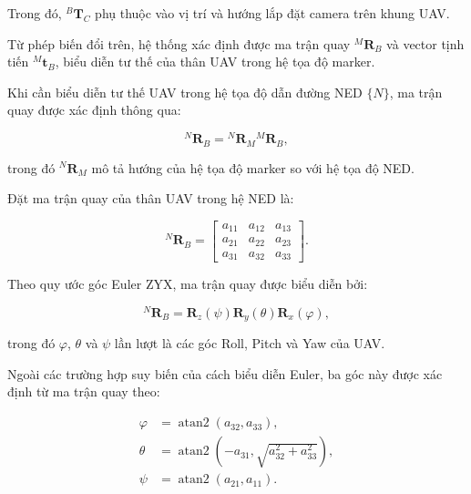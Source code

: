 Trong đó, ${}^{B}\mathbf{T}_{C}$ phụ thuộc
vào vị trí và hướng lắp đặt camera trên
khung UAV.

Từ phép biến đổi trên, hệ thống xác định
được ma trận quay ${}^{M}\mathbf{R}_{B}$
và vector tịnh tiến ${}^{M}\mathbf{t}_{B}$,
biểu diễn tư thế của thân UAV trong hệ
tọa độ marker.

Khi cần biểu diễn tư thế UAV trong hệ
tọa độ dẫn đường NED $\{N\}$, ma trận quay
được xác định thông qua:

\begin{equation}
{}^{N}\mathbf{R}_{B}
=
{}^{N}\mathbf{R}_{M}
{}^{M}\mathbf{R}_{B},
\label{eq:body_attitude_ned}
\end{equation}

trong đó ${}^{N}\mathbf{R}_{M}$ mô tả hướng
của hệ tọa độ marker so với hệ tọa độ NED.

Đặt ma trận quay của thân UAV trong hệ NED là:

\begin{equation}
{}^{N}\mathbf{R}_{B}
=
\begin{bmatrix}
a_{11}&a_{12}&a_{13}\\
a_{21}&a_{22}&a_{23}\\
a_{31}&a_{32}&a_{33}
\end{bmatrix}.
\label{eq:body_rotation_matrix}
\end{equation}

Theo quy ước góc Euler ZYX, ma trận quay
được biểu diễn bởi:

\begin{equation}
{}^{N}\mathbf{R}_{B}
=
\mathbf{R}_z(\psi)
\mathbf{R}_y(\theta)
\mathbf{R}_x(\varphi),
\label{eq:euler_zyx}
\end{equation}

trong đó $\varphi$, $\theta$ và $\psi$
lần lượt là các góc Roll, Pitch và Yaw
của UAV.

Ngoài các trường hợp suy biến của cách
biểu diễn Euler, ba góc này được xác định
từ ma trận quay theo:

\begin{equation}
\begin{aligned}
\varphi &=
\operatorname{atan2}(a_{32},a_{33}),\\[6pt]
\theta &=
\operatorname{atan2}
\left(
-a_{31},
\sqrt{a_{32}^{2}+a_{33}^{2}}
\right),\\[6pt]
\psi &=
\operatorname{atan2}(a_{21},a_{11}).
\end{aligned}
\label{eq:roll_pitch_yaw}
\end{equation}

